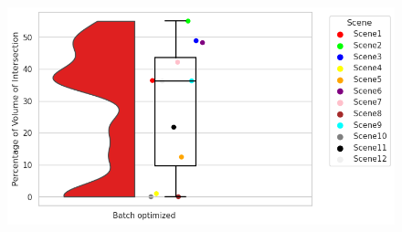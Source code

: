 \documentclass[report.tex]{subfiles}
\begin{document}
\begin{itemize}
\begin{figure}[H]
\centering
\begin{minipage}{.45\textwidth}
  \centering
  \includegraphics[scale=0.45]{Images/Percentage_of_Volume_of_Intersection.png}
  \label{fig:Percentage_of_Volume_of_Intersection.png}
\end{minipage}

\end{figure}

    
\end{itemize}
\end{document}

